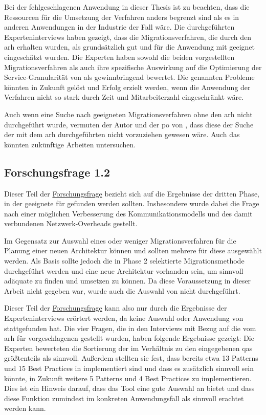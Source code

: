 Bei der fehlgeschlagenen Anwendung in dieser Thesis ist zu beachten, dass die Ressourcen für die Umsetzung der Verfahren anders begrenzt sind als es in anderen Anwendungen in der Industrie der Fall wäre.
Die durchgeführten Experteninterviews haben gezeigt, dass die Migrationsverfahren, die durch den \gls{arh} erhalten wurden, als grundsätzlich gut und für die Anwendung mit \jf geeignet eingeschätzt wurden.
Die Experten haben sowohl die beiden vorgestellten Migrationsverfahren als auch ihre spezifische Auswirkung auf die Optimierung der Service-Granularität von \jf als gewinnbringend bewertet.
Die genannten Probleme könnten in Zukunft gelöst und Erfolg erzielt werden, wenn die Anwendung der Verfahren nicht so stark durch Zeit und Mitarbeiterzahl eingeschränkt wäre.

Auch wenn eine Suche nach geeigneten Migrationsverfahren ohne den \gls{arh} nicht durchgeführt wurde, vermuten der Autor und der \gls{po} von \jf, dass diese der Suche der mit dem \gls{arh} durchgeführten nicht vorzuziehen gewesen wäre.
Auch das könnten zukünftige Arbeiten untersuchen.

\subsection{Forschungsfrage 1.2}

Dieser Teil der \hyperref[forschungsfrage:1]{Forschungsfrage} bezieht sich auf die Ergebnisse der dritten Phase, in der geeignete \bpp für \jf gefunden werden sollten.
Insbesondere wurde dabei die Frage nach einer möglichen Verbesserung des Kommunikationsmodells und des damit verbundenen Netzwerk-Overheads gestellt.

Im Gegensatz zur Auswahl eines oder weniger Migrationsverfahren für die Planung einer neuen Architektur können und sollten mehrere \bpp für diese ausgewählt werden.
Als Basis sollte jedoch die in Phase 2 selektierte Migrationsmethode durchgeführt werden und eine neue Architektur vorhanden sein, um sinnvoll adäquate \bpp zu finden und umsetzen zu können.
Da diese Voraussetzung in dieser Arbeit nicht gegeben war, wurde auch die Auswahl von \bpp nicht durchgeführt.

Dieser Teil der  \hyperref[forschungsfrage:1]{Forschungsfrage} kann also nur durch die Ergebnisse der Experteninterviews erörtert werden, da keine Auswahl oder Anwendung von \bpp stattgefunden hat.
Die vier Fragen, die in den Interviews mit Bezug auf die vom \gls{arh} für \jf vorgeschlagenen \bpp gestellt wurden, haben folgende Ergebnisse gezeigt:
Die Experten bewerteten die Sortierung der \bpp im Verhältnis zu den eingegebenen \glspl{qa} größtenteils als sinnvoll.
Außerdem stellten sie fest, dass bereits etwa 13 Patterns und 15 Best Practices in \jf implementiert sind und dass es zusätzlich sinnvoll sein könnte, in Zukunft weitere 5 Patterns und 4 Best Practices zu implementieren.
Dies ist ein Hinweis darauf, dass das Tool eine gute Auswahl an \bpp bietet und dass diese Funktion zumindest im konkreten Anwendungsfall als sinnvoll erachtet werden kann.

